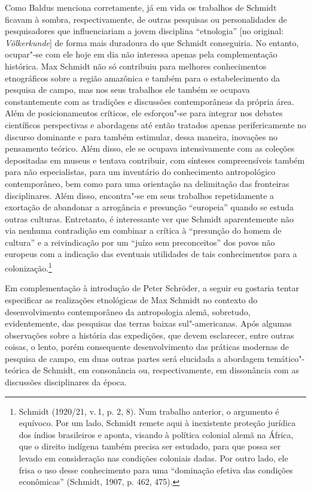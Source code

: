 Como Baldus menciona corretamente, já em vida os trabalhos de Schmidt
ficavam à sombra, respectivamente, de outras pesquisas ou personalidades
de pesquisadores que influenciariam a jovem disciplina ``etnologia''
{[}no original: \emph{Völkerkunde}{]} de forma mais duradoura do que
Schmidt conseguiria. No entanto, ocupar"-se com ele hoje em dia não
interessa apenas pela complementação histórica. Max Schmidt não só
contribuiu para melhores conhecimentos etnográficos sobre a região
amazônica e também para o estabelecimento da pesquisa de campo, mas nos
seus trabalhos ele também se ocupava constantemente com as tradições e
discussões contemporâneas da própria área. Além de posicionamentos
críticos, ele esforçou"-se para integrar nos debates científicos
perspectivas e abordagens até então tratados apenas perifericamente no
discurso dominante e para também estimular, dessa maneira, inovações no
pensamento teórico. Além disso, ele se ocupava intensivamente com as
coleções depositadas em museus e tentava contribuir, com sínteses
compreensíveis também para não especialistas, para um inventário do
conhecimento antropológico contemporâneo, bem como para uma orientação
na delimitação das fronteiras disciplinares. Além disso, encontra"-se em
seus trabalhos repetidamente a exortação de abandonar a arrogância e
presunção ``europeia'' quando se estuda outras culturas. Entretanto, é
interessante ver que Schmidt aparentemente não via nenhuma contradição
em combinar a crítica à ``presunção do homem de cultura'' e a
reivindicação por um ``juízo sem preconceitos'' dos povos não europeus
com a indicação das eventuais utilidades de tais conhecimentos para a
colonização.\footnote{Schmidt (1920/21, v.\,1, p. 2, 8). Num trabalho
  anterior, o argumento é equívoco. Por um lado, Schmidt remete aqui à
  inexistente proteção jurídica dos índios brasileiros e aponta,
  visando à política colonial alemã na África, que o direito indígena
  também precisa ser estudado, para que possa ser levado em consideração
  nas condições coloniais dadas. Por outro lado, ele frisa o uso desse
  conhecimento para uma ``dominação efetiva das condições econômicas''
  (Schmidt, 1907, p. 462, 475).}

Em complementação à introdução de Peter Schröder, a seguir eu gostaria
tentar especificar as realizações etnológicas de Max Schmidt no contexto
do desenvolvimento contemporâneo da antropologia alemã, sobretudo,
evidentemente, das pesquisas das terras baixas sul"-americanas. Após
algumas observações sobre a história das expedições, que devem
esclarecer, entre outras coisas, o lento, porém consequente
desenvolvimento das práticas modernas de pesquisa de campo, em duas
outras partes será elucidada a abordagem temático"-teórica de Schmidt, em
consonância ou, respectivamente, em dissonância com as discussões
disciplinares da época.

